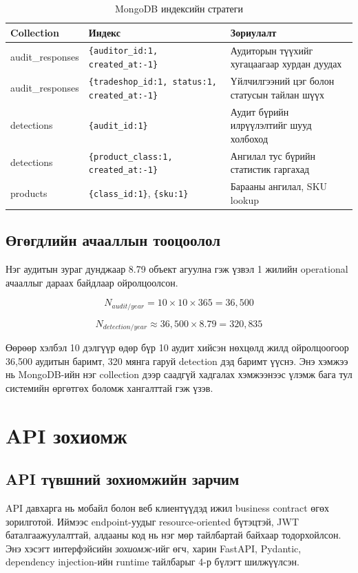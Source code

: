\begin{longtable}{|p{3.2cm}|p{4.4cm}|p{4.4cm}|}
\caption{MongoDB индексийн стратеги}
\label{tab:index_strategy} \\
\hline
\textbf{Collection} & \textbf{Индекс} & \textbf{Зориулалт} \\
\hline
audit\_responses & \texttt{\{auditor\_id:1, created\_at:-1\}} & Аудиторын түүхийг хугацаагаар хурдан дуудах \\
\hline
audit\_responses & \texttt{\{tradeshop\_id:1, status:1, created\_at:-1\}} & Үйлчилгээний цэг болон статусын тайлан шүүх \\
\hline
detections & \texttt{\{audit\_id:1\}} & Аудит бүрийн илрүүлэлтийг шууд холбоход \\
\hline
detections & \texttt{\{product\_class:1, created\_at:-1\}} & Ангилал тус бүрийн статистик гаргахад \\
\hline
products & \texttt{\{class\_id:1\}}, \texttt{\{sku:1\}} & Барааны ангилал, SKU lookup \\
\hline
\end{longtable}

\subsection{Өгөгдлийн ачааллын тооцоолол}

Нэг аудитын зураг дунджаар 8.79 объект агуулна гэж үзвэл 1 жилийн operational ачааллыг дараах байдлаар ойролцоолсон.

\begin{equation}
    N_{audit/year} = 10 \times 10 \times 365 = 36{,}500
\end{equation}

\begin{equation}
    N_{detection/year} \approx 36{,}500 \times 8.79 = 320{,}835
\end{equation}

Өөрөөр хэлбэл 10 дэлгүүр өдөр бүр 10 аудит хийсэн нөхцөлд жилд ойролцоогоор 36,500 аудитын баримт, 320 мянга гаруй detection дэд баримт үүснэ. Энэ хэмжээ нь MongoDB-ийн нэг collection дээр саадгүй хадгалах хэмжээнээс үлэмж бага тул системийн өргөтгөх боломж хангалттай гэж үзэв.

\section{API зохиомж}

\subsection{API түвшний зохиомжийн зарчим}
API давхарга нь мобайл болон веб клиентүүдэд ижил business contract өгөх зорилготой. Иймээс endpoint-уудыг resource-oriented бүтэцтэй, JWT баталгаажуулалттай, алдааны код нь нэг мөр тайлбартай байхаар тодорхойлсон. Энэ хэсэгт интерфэйсийн \textit{зохиомж}-ийг өгч, харин FastAPI, Pydantic, dependency injection-ийн runtime тайлбарыг 4-р бүлэгт шилжүүлсэн.

